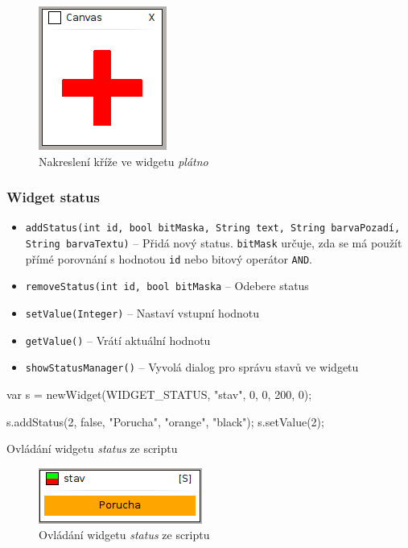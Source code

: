 \documentclass[12pt, a4paper, oneside]{article}
\newcommand{\It}{\textit}  %
\begin{document}
\begin{figure}[H]
\begin{center}
\includegraphics[scale=1]{img/w_canvas.png}
\caption{Nakreslení kříže ve widgetu \It{plátno}}
\end{center}
\end{figure}

\subsubsection*{Widget status}
\begin{itemize}
    \item {\color{blue}\verb/addStatus(int id, bool bitMaska, String text, String barvaPozadí, String barvaTextu)/} -- Přidá nový status. \verb|bitMask| určuje, zda se má použít přímé porovnání s hodnotou \verb|id| nebo bitový operátor \verb|AND|.
    \item {\color{blue}\verb/removeStatus(int id, bool bitMaska/} -- Odebere status
    \item {\color{blue}\verb/setValue(Integer)/} -- Nastaví vstupní hodnotu
    \item {\color{blue}\verb/getValue()/} -- Vrátí aktuální hodnotu
    \item {\color{blue}\verb/showStatusManager()/} -- Vyvolá dialog pro správu stavů ve widgetu
\end{itemize}

\begin{listing}[H]
\begin{jscode}
var s = newWidget(WIDGET_STATUS, "stav", 0, 0, 200, 0);

s.addStatus(2, false, "Porucha", "orange", "black");
s.setValue(2);
\end{jscode}
\caption{Ovládání widgetu \It{status} ze scriptu}
\end{listing}

\begin{figure}[H]
\begin{center}
\includegraphics[scale=1]{img/status_script.png}
\caption{Ovládání widgetu \It{status} ze scriptu}
\end{center}
\end{figure}
\end{document}
